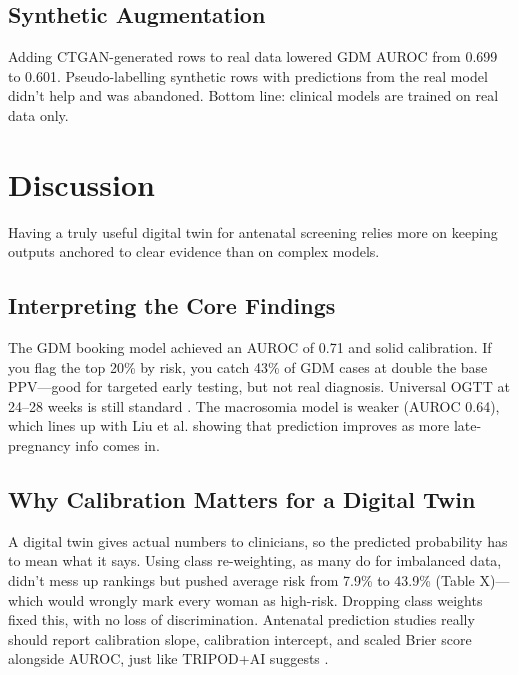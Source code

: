 \documentclass[conference]{IEEEtran}
\begin{document}
\subsection{Synthetic Augmentation}

Adding CTGAN-generated rows to real data lowered GDM AUROC from 0.699 to 0.601. Pseudo-labelling synthetic rows with predictions from the real model didn't help and was abandoned. Bottom line: clinical models are trained on real data only.



\section{Discussion}

Having a truly useful digital twin for antenatal screening relies more on keeping outputs anchored to clear evidence than on complex models.



\subsection{Interpreting the Core Findings}

The GDM booking model achieved an AUROC of 0.71 and solid calibration. If you flag the top 20\% by risk, you catch 43\% of GDM cases at double the base PPV---good for targeted early testing, but not real diagnosis. Universal OGTT at 24--28 weeks is still standard \cite{r1,r40}. The macrosomia model is weaker (AUROC 0.64), which lines up with Liu et al. \cite{r6} showing that prediction improves as more late-pregnancy info comes in.



\subsection{Why Calibration Matters for a Digital Twin}

A digital twin gives actual numbers to clinicians, so the predicted probability has to mean what it says. Using class re-weighting, as many do for imbalanced data, didn't mess up rankings but pushed average risk from 7.9\% to 43.9\% (Table X)---which would wrongly mark every woman as high-risk. Dropping class weights fixed this, with no loss of discrimination. Antenatal prediction studies really should report calibration slope, calibration intercept, and scaled Brier score alongside AUROC, just like TRIPOD+AI suggests \cite{r33}.
\end{document}

